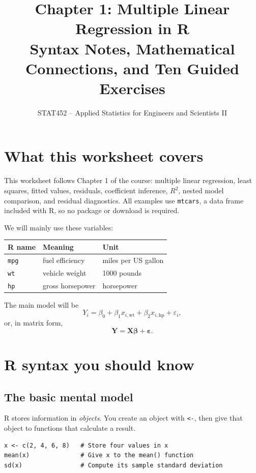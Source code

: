 \documentclass[11pt]{article}
\title{Chapter 1: Multiple Linear Regression in R\\
\large Syntax Notes, Mathematical Connections, and Ten Guided Exercises}
\author{STAT452 -- Applied Statistics for Engineers and Scientists II}
\date{}
\begin{document}
\maketitle
\tableofcontents
\bigskip

\section{What this worksheet covers}

This worksheet follows Chapter 1 of the course: multiple linear regression,
least squares, fitted values, residuals, coefficient inference, $R^2$, nested
model comparison, and residual diagnostics. All examples use \texttt{mtcars},
a data frame included with R, so no package or download is required.

We will mainly use these variables:
\begin{center}
\begin{tabular}{lll}
\toprule
R name & Meaning & Unit\\
\midrule
\texttt{mpg} & fuel efficiency & miles per US gallon\\
\texttt{wt} & vehicle weight & 1000 pounds\\
\texttt{hp} & gross horsepower & horsepower\\
\bottomrule
\end{tabular}
\end{center}

The main model will be
\[
  Y_i=\beta_0+\beta_1x_{i,\mathrm{wt}}
      +\beta_2x_{i,\mathrm{hp}}+\varepsilon_i,
\]
or, in matrix form,
\[
  \mathbf Y=\mathbf X\boldsymbol\beta+\boldsymbol\varepsilon.
\]

\section{R syntax you should know}

\subsection{The basic mental model}

R stores information in \emph{objects}. You create an object with
\texttt{<-}, then give that object to functions that calculate a result.

\begin{lstlisting}
x <- c(2, 4, 6, 8)   # Store four values in x
mean(x)              # Give x to the mean() function
sd(x)                # Compute its sample standard deviation
\end{lstlisting}
\end{document}

